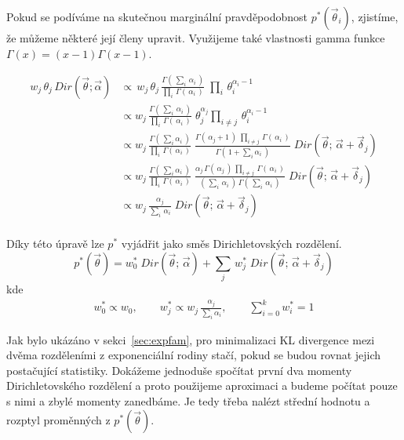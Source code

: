Pokud se podíváme na skutečnou marginální pravděpodobnost
$p^*(\vec{\theta}_i)$, zjistíme, že můžeme některé její členy upravit.
Využijeme také vlastnosti gamma funkce $\Gamma(x) = (x-1) \Gamma(x-1)$.

\begin{align}
w_j \, \theta_j \, Dir(\vec{\theta}; \vec{\alpha}) &\propto \,
    w_j \, \theta_j \, \frac{\Gamma (\, \sum_i \, \alpha_{i} \,)}{\prod_i \, \Gamma(\,\alpha_i\,)}\;
    \prod_i \, \theta_{i}^{\alpha_{i} - 1}
\label{eq:4}
\\
&\propto w_j \, \frac{\Gamma (\,\sum_i \, \alpha_{i}\,)} {\prod_i \,
    \Gamma(\,\alpha_{i}\,)} \; \theta_j^{\alpha_j} \prod_{i \ne j} \,
    \theta_{i}^{\alpha_{i} - 1} \\
&\propto w_j \,
    \frac{\Gamma (\,\sum_i \alpha_{i}\,)}
         {\prod_i \, \Gamma(\, \alpha_{i} \,)} \;
    \frac{\Gamma(\, \alpha_{j} + 1 \,) \; \prod_{i \ne j} \, \Gamma(\,\alpha_i\,)}
         {\Gamma (\,1 + \sum_i \alpha_i\,)} \;
    Dir(\vec\theta; \, \vec{\alpha} + \vec{\delta}_j) \\
&\propto w_j \,
    \frac{\Gamma (\,\sum_i \alpha_{i}\,)}
         {\prod_i \, \Gamma(\, \alpha_{i}\,)} \;
    \frac{\alpha_j \, \Gamma(\,\alpha_j\,) \, \prod_{i \ne j} \, \Gamma(\,\alpha_i\,)}
         {(\,\sum_i \, \alpha_i\,) \, \Gamma (\,\sum_i \,\alpha_i\,)}\;
    Dir(\vec\theta; \,\vec{\alpha} + \vec{\delta}_j) \\
&\propto w_j \,
    \frac{\alpha_j}
         {\sum_i \, \alpha_i} \;
    Dir(\vec\theta; \,\vec{\alpha} + \vec{\delta}_j) \\
\end{align}

Díky této úpravě lze $p^*$ vyjádřit jako směs Dirichletovských rozdělení.
\begin{equation}
p^*(\vec{\theta}) =
    w_0^* \; Dir(\vec{\theta};\, \vec{\alpha}) +
    \sum_j \, w^*_j \;
        Dir(\vec{\theta};\, \vec{\alpha} + \vec{\delta}_j)
\label{eq:marginaltheta}
\end{equation}
kde
\begin{align}
    w^*_0 \propto w_0, \quad \quad
    w^*_j \propto w_j \, \frac{\alpha_j}{\sum_i \alpha_i}, \quad \quad
    \sum_{i=0}^k w_i^* = 1
\end{align}

Jak bylo ukázáno v sekci~\ref{sec:expfam}, pro minimalizaci KL divergence mezi dvěma rozděleními z exponenciální rodiny
stačí, pokud se budou rovnat jejich postačující statistiky. Dokážeme jednoduše
spočítat první dva momenty Dirichletovského rozdělení a proto použijeme
aproximaci a budeme počítat pouze s nimi a zbylé momenty zanedbáme.
Je tedy třeba nalézt střední hodnotu a rozptyl proměnných z $p^*(\vec\theta)$.

